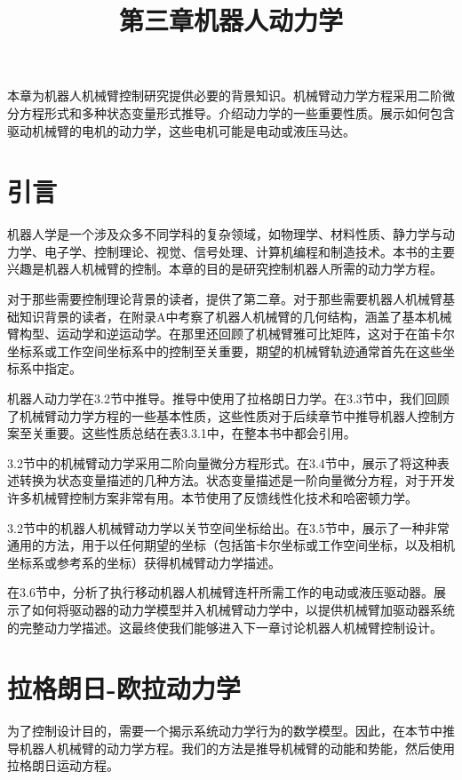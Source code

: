 \documentclass[12pt,a4paper]{ctexart}
\title{第三章\quad 机器人动力学}
\author{}
\date{}
\begin{document}
\maketitle

本章为机器人机械臂控制研究提供必要的背景知识。机械臂动力学方程采用二阶微分方程形式和多种状态变量形式推导。介绍动力学的一些重要性质。展示如何包含驱动机械臂的电机的动力学，这些电机可能是电动或液压马达。

\section{引言}

机器人学是一个涉及众多不同学科的复杂领域，如物理学、材料性质、静力学与动力学、电子学、控制理论、视觉、信号处理、计算机编程和制造技术。本书的主要兴趣是机器人机械臂的控制。本章的目的是研究控制机器人所需的动力学方程。

对于那些需要控制理论背景的读者，提供了第二章。对于那些需要机器人机械臂基础知识背景的读者，在附录A中考察了机器人机械臂的几何结构，涵盖了基本机械臂构型、运动学和逆运动学。在那里还回顾了机械臂雅可比矩阵，这对于在笛卡尔坐标系或工作空间坐标系中的控制至关重要，期望的机械臂轨迹通常首先在这些坐标系中指定。

机器人动力学在3.2节中推导。推导中使用了拉格朗日力学。在3.3节中，我们回顾了机械臂动力学方程的一些基本性质，这些性质对于后续章节中推导机器人控制方案至关重要。这些性质总结在表3.3.1中，在整本书中都会引用。

3.2节中的机械臂动力学采用二阶向量微分方程形式。在3.4节中，展示了将这种表述转换为状态变量描述的几种方法。状态变量描述是一阶向量微分方程，对于开发许多机械臂控制方案非常有用。本节使用了反馈线性化技术和哈密顿力学。

3.2节中的机器人机械臂动力学以关节空间坐标给出。在3.5节中，展示了一种非常通用的方法，用于以任何期望的坐标（包括笛卡尔坐标或工作空间坐标，以及相机坐标系或参考系的坐标）获得机械臂动力学描述。

在3.6节中，分析了执行移动机器人机械臂连杆所需工作的电动或液压驱动器。展示了如何将驱动器的动力学模型并入机械臂动力学中，以提供机械臂加驱动器系统的完整动力学描述。这最终使我们能够进入下一章讨论机器人机械臂控制设计。

\section{拉格朗日-欧拉动力学}

为了控制设计目的，需要一个揭示系统动力学行为的数学模型。因此，在本节中推导机器人机械臂的动力学方程。我们的方法是推导机械臂的动能和势能，然后使用拉格朗日运动方程。
\end{document}
